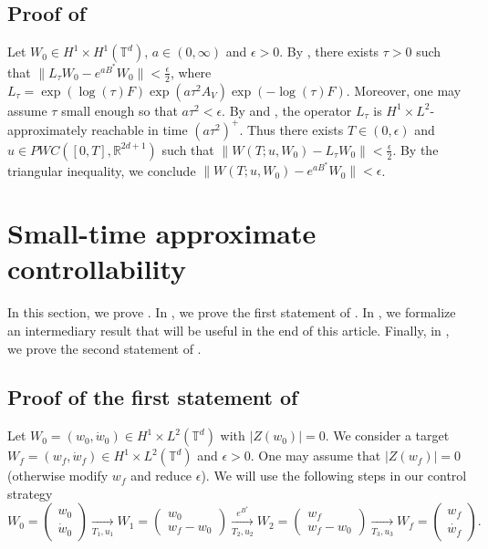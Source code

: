 \documentclass[a4paper]{article}
\theoremstyle{plain}
\newcommand{\T}{\mathbb{T}}
\newcommand{\R}{\mathbb{R}}
\begin{document}
\subsection{Proof of }
\label{subsec:Proof_vel->prof}


    Let $W_0 \in H^1 \times H^1(\T^d)$, $a \in (0,\infty)$ and $\epsilon>0$. By , there exists $\tau>0$ such that $\| L_{\tau}W_0 - e^{a B^*}W_0\| < \frac{\epsilon}{2}$,
where $L_{\tau} = \exp(\log(\tau)F) \exp( a \tau^2 A_V) \exp(-\log(\tau)F)$. Moreover, one may assume $\tau$ small enough so that $a\tau^2<\epsilon$. By  and , the operator $L_{\tau}$ is $H^1 \times L^2$-approximately reachable in time $(a\tau^2)^+$. Thus there exists $T \in (0,\epsilon)$ and $u \in PWC([0,T],\R^{2d+1})$ such that 
$\|W(T;u,W_0)-L_{\tau}W_0\| < \frac{\epsilon}{2}$. By the triangular inequality, we conclude $\| W(T;u,W_0)-e^{aB^*}W_0\|<\epsilon$.






\section{Small-time approximate controllability}
\label{sec:STAC}


In this section, we prove . 
In , we prove the first statement of .
In , we formalize an intermediary result that will be useful in the end of this article. Finally, in , we prove the second statement of .


\subsection{Proof of the first statement of }    
\label{subsec:STAC_1}


Let $W_0=(w_0,\dot{w}_0) \in H^1 \times L^2(\T^d)$ with $|Z(w_0)|=0$.
We consider a target $W_f=(w_f,\dot{w}_f) \in H^1 \times L^2(\T^d)$ and $\epsilon>0$. One may assume that $|Z(w_f)|=0$ (otherwise modify $w_f$ and reduce $\epsilon$). We will use the following steps in our control strategy
$$W_0=\begin{pmatrix}
    w_0 \\ \dot{w}_0
\end{pmatrix}
\xrightarrow[T_1,u_1]{} 
W_1=\begin{pmatrix}
    w_0 \\ w_f-w_0
\end{pmatrix}
\xrightarrow[T_2,u_2]{e^{B^*}} 
W_2=\begin{pmatrix}
    w_f \\ w_f-w_0
\end{pmatrix}
\xrightarrow[T_3,u_3]{}
W_f=\begin{pmatrix}
    w_f \\ \dot{w_f}
\end{pmatrix}.$$
\end{document}
